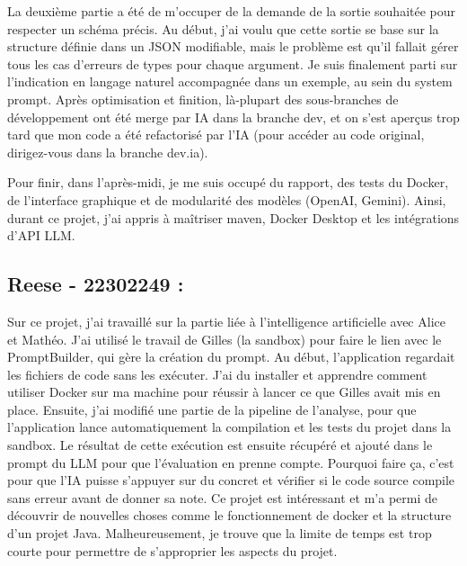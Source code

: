 \documentclass[11pt,a4paper]{article}
\begin{document}
La deuxième partie a été de m’occuper de la demande de la sortie souhaitée pour respecter un schéma précis. Au début, j’ai voulu que cette sortie se base sur la structure définie dans un JSON modifiable, mais le problème est qu’il fallait gérer tous les cas d’erreurs de types pour chaque argument. Je suis finalement parti sur l’indication en langage naturel accompagnée dans un exemple, au sein du system prompt. Après optimisation et finition, là-plupart des sous-branches de développement ont été merge par IA dans la branche dev, et on s’est aperçus trop tard que mon code a été refactorisé par l’IA (pour accéder au code original, dirigez-vous dans la branche dev.ia).

Pour finir, dans l’après-midi, je me suis occupé du rapport, des tests du Docker, de l’interface graphique et de modularité des modèles (OpenAI, Gemini). Ainsi, durant ce projet, j’ai appris à maîtriser maven, Docker Desktop et les intégrations d’API LLM.

\subsection*{Reese - 22302249 :}
Sur ce projet, j'ai travaillé sur la partie liée à l'intelligence artificielle avec Alice et Mathéo. J'ai utilisé le travail de Gilles (la sandbox) pour faire le lien avec le PromptBuilder, qui gère la création du prompt. Au début, l'application regardait les fichiers de code sans les exécuter. J'ai du installer et apprendre comment utiliser Docker sur ma machine pour réussir à lancer ce que Gilles avait mis en place. Ensuite, j'ai modifié une partie de la pipeline de l'analyse, pour que l'application lance automatiquement la compilation et les tests du projet dans la sandbox. Le résultat de cette exécution est ensuite récupéré et ajouté dans le prompt du LLM pour que l'évaluation en prenne compte. Pourquoi faire ça, c'est pour que l'IA puisse s'appuyer sur du concret et vérifier si le code source compile sans erreur avant de donner sa note. Ce projet est intéressant et m'a permi de découvrir de nouvelles choses comme le fonctionnement de docker et la structure d'un projet Java. Malheureusement, je trouve que la limite de temps est trop courte pour permettre de s'approprier les aspects du projet.
\end{document}
